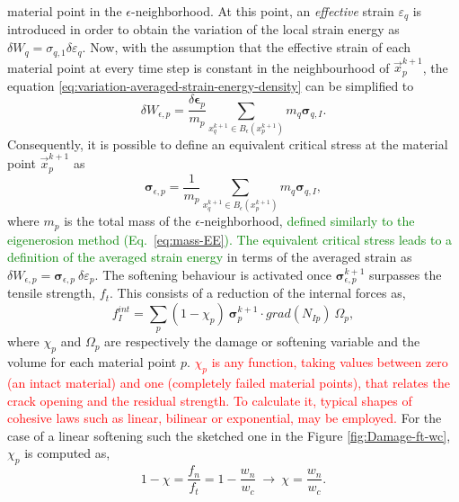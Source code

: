 \documentclass[preprint,12pt,a4paper]{elsarticle}
\newcommand{\tens}[1]{
  \ensuremath{\mathbf{{#1}}}
}
\newcommand\Grad[1]{grad({#1})}
\newcommand{\PNA}[1]{
  \textcolor{red}{{#1}}
}
\newcommand{\DM}[1]{
  \textcolor{green}{{#1}}
}
\begin{document}
material point in the $\epsilon$-neighborhood. At this point, an \textit{effective} strain $\varepsilon_q$ is introduced in order to obtain the variation of
the local strain energy as $\delta W_q = \sigma_{q,1}
\delta\varepsilon_q$. Now, with the assumption that the effective
strain of each material point at every time step is constant in the
neighbourhood of $\vec{x}_p^{k+1}$, the equation 
\eqref{eq:variation-averaged-strain-energy-density} can be simplified
 to
\begin{equation}
  \label{eq:variation-averaged-strain-energy-density-simpli}
  \delta W_{\epsilon,p} =
  \frac{\delta \tens{\epsilon}_p}{m_p} \sum_{x_q^{k+1} \in
  B_{\epsilon}(x_p^{k+1})} m_q \tens{\sigma}_{q,I}. 
\end{equation}
Consequently, it is possible to define an equivalent critical stress at the
material point $\vec{x}_p^{k+1}$ as
\begin{equation}
  \label{eq:equivalent-critical-stress}
  \tens{\sigma}_{\epsilon,p} =
  \frac{1}{m_p} \sum_{x_q^{k+1} \in
  B_{\epsilon}(x_p^{k+1})} m_q \tens{\sigma}_{q,I}, 
\end{equation}
where $m_p$ is the total mass of the
$\epsilon$-neighborhood,\DM{defined similarly to the eigenerosion
  method (Eq.~\eqref{eq:mass-EE}). The equivalent critical stress
  leads to a definition of the   averaged strain energy} in terms of the averaged
strain as $\delta W_{\epsilon,p} =
 \tens{\sigma}_{\epsilon,p}\ \delta\varepsilon_p$. The softening behaviour is
activated once $\tens{\sigma}_{\epsilon,p}^{k+1}$ surpasses the
tensile strength, $f_t$. This consists of a reduction of the internal
forces as, 
 \begin{equation}
   \label{eq:f-int-damaged}
   f^{int}_I = \sum_p (1 - \chi_p)\ \tens{\sigma}_{p}^{k+1} \cdot
   \Grad{N_{Ip}}\ \Omega_p,
 \end{equation}
where $\chi_p$ and $\Omega_p$ are respectively the damage or softening
variable and the volume for each material point $p$. \PNA{$\chi_p$ is any function, taking
values between zero (an intact material) and one (completely failed
material points), that relates the crack opening and the residual strength. To calculate it, typical shapes of cohesive laws such as linear, bilinear or exponential, may be employed.} For the case of a linear softening such the sketched one in the Figure \ref{fig:Damage-ft-wc}, $\chi_p$ is computed as,
 \begin{equation}
   \label{eq:damaged-variable-chi}
   1 - \chi = \frac{f_n}{f_t} = 1 - \frac{w_n}{w_c}\ \rightarrow\ \chi
   = \frac{w_n}{w_c}.
 \end{equation}
\end{document}
